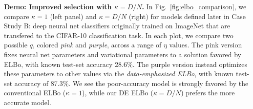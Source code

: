 

\textbf{Demo: Improved selection with $\kappa=D/N$.}
In Fig.~\ref{fig:elbo_comparison}, we compare $\kappa=1$ (left panel) and $\kappa=D/N$ (right) for models defined later in Case Study B: deep neural net classifiers originally trained on ImageNet that are transfered to the CIFAR-10 classification task. In each plot, we compare two possible $q$, colored \emph{pink} and \emph{purple}, across a range of $\eta$ values. The pink version fixes neural net parameters and variational parameters to a solution favored by ELBo, with known test-set accuracy 28.6\%. The purple version instead optimizes these parameters to other values via the \emph{data-emphasized ELBo}, with known test-set accuracy of 87.3\%. We see the poor-accuracy model is strongly favored by the conventional ELBo ($\kappa{=}1$), while our DE ELBo ($\kappa{=}D/N$) prefers the more accurate model.
